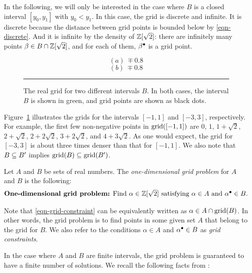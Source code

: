 \documentclass{article}
\begin{document}
In the following, we will only be interested in the case where $B$ is
a closed interval $[y_0,y_1]$ with $y_0<y_1$. In this case, the grid
is discrete and infinite. It is discrete because the distance between
grid points is bounded below by {\eqref{eqn-discrete}}. And it is
infinite by the density of $\mathbb{Z}[\sqrt 2]$: there are infinitely many
points $\beta\in B\cap \mathbb{Z}[\sqrt 2]$, and for each of them, $\beta^{\bullet}$
is a grid point.

\begin{figure}
  \[ (a)~
  \mp{0.8}{}
  \]
  \[ (b)~
  \mp{0.8}{}
  \]
  \caption{The real grid for two different intervals $B$. In both
    cases, the interval $B$ is shown in green, and grid points are
    shown as black dots.}
  \label{fig-grid-1d}
  \rule{\textwidth}{0.1mm}
\end{figure}

\begin{example}
  Figure~\ref{fig-grid-1d} illustrates the grids for the intervals
  $[-1,1]$ and $[-3,3]$, respectively. For example, the first few
  non-negative points in $\mathop{\rm grid}\nolimits([-1,1])$ are $0$, $1$, $1+\sqrt2$,
  $2+\sqrt2$, $2+2\sqrt2$, $3+2\sqrt 2$, and $4+3\sqrt 2$. As one
  would expect, the grid for $[-3,3]$ is about three times denser than
  that for $[-1,1]$.  We also note that $B\subseteq B'$ implies
  $\mathop{\rm grid}\nolimits(B)\subseteq\mathop{\rm grid}\nolimits(B')$.
\end{example}

\begin{definition}
  Let $A$ and $B$ be sets of real numbers.  The {\em one-dimensional
    grid problem} for $A$ and $B$ is the following:
  \begin{equation}\label{eqn-grid-constraint}
    \mbox{{\bf One-dimensional grid problem:} Find $\alpha\in\mathbb{Z}[\sqrt
      2]$ satisfying $\alpha \in A$ and $\alpha^{\bullet}\in B$.}
  \end{equation}
\end{definition}

Note that {\eqref{eqn-grid-constraint}} can be equivalently written as
$\alpha \in A \cap \mathop{\rm grid}\nolimits(B)$. In other words, the grid problem is to
find points in some given set $A$ that belong to the grid for $B$. We
also refer to the conditions $\alpha\in A$ and $\alpha^{\bullet}\in B$ as
{\em grid constraints}.

In the case where $A$ and $B$ are finite intervals, the grid problem
is guaranteed to have a finite number of solutions.  We recall the
following facts from {\cite{Selinger-newsynth}}:
\end{document}
